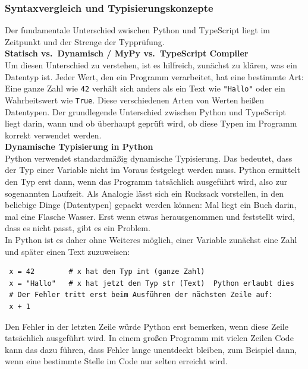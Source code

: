 \subsubsection{Syntaxvergleich und Typisierungskonzepte}
Der fundamentale Unterschied zwischen Python und TypeScript liegt im Zeitpunkt und der Strenge der Typprüfung. \\


\noindent \textbf{Statisch vs.\ Dynamisch / MyPy vs.\ TypeScript Compiler}\\
Um diesen Unterschied zu verstehen, ist es hilfreich, zunächst zu klären, was ein Datentyp ist.
Jeder Wert, den ein Programm verarbeitet, hat eine bestimmte Art: Eine ganze Zahl wie \texttt{42}
verhält sich anders als ein Text wie \texttt{"Hallo"} oder ein Wahrheitswert wie \texttt{True}.
Diese verschiedenen Arten von Werten heißen Datentypen.
Der grundlegende Unterschied zwischen Python und TypeScript liegt darin, wann und
ob überhaupt geprüft wird, ob diese Typen im Programm korrekt verwendet werden.\\


\noindent \textbf{Dynamische Typisierung in Python}
\\
Python verwendet standardmäßig dynamische Typisierung.
Das bedeutet, dass der Typ einer Variable nicht im Voraus festgelegt werden muss.
Python ermittelt den Typ erst dann, wenn das Programm tatsächlich ausgeführt wird, also
zur sogenannten Laufzeit.
Als Analogie lässt sich ein Rucksack vorstellen, in den beliebige Dinge (Datentypen) gepackt werden können:
Mal liegt ein Buch darin, mal eine Flasche Wasser.
Erst wenn etwas herausgenommen und feststellt wird, dass es nicht passt, gibt es ein Problem.\\
In Python ist es daher ohne Weiteres möglich, einer Variable zunächst eine Zahl
und später einen Text zuzuweisen:

\begin{verbatim}
 x = 42        # x hat den Typ int (ganze Zahl)
 x = "Hallo"   # x hat jetzt den Typ str (Text)  Python erlaubt dies
 # Der Fehler tritt erst beim Ausführen der nächsten Zeile auf:
 x + 1
\end{verbatim}

Den Fehler in der letzten Zeile würde Python erst bemerken, wenn diese Zeile tatsächlich ausgeführt wird.
In einem großen Programm mit vielen Zeilen Code kann das dazu führen, dass Fehler lange
unentdeckt bleiben, zum Beispiel dann, wenn eine bestimmte Stelle im Code nur selten erreicht wird.\\

